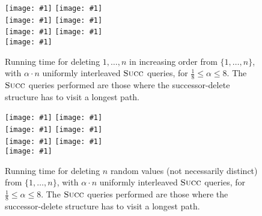 \documentclass[a4paper]{lipics-v2021}
\newcommand{\plot}[1]{\texttt{[image: \#1]}}
\newcommand{\FuncName}[1]{\textup{\textsc{#1}}}
\newcommand{\Succ}{\FuncName{Succ}}
\begin{document}
\begin{figure}[p]
  \plot{successor-query-worst-case-0.125.pdf} \hfill
  \plot{successor-query-worst-case-0.250.pdf} \\
  \plot{successor-query-worst-case-0.500.pdf} \hfill
  \plot{successor-query-worst-case-1.000.pdf} \\
  \plot{successor-query-worst-case-2.000.pdf} \hfill
  \plot{successor-query-worst-case-4.000.pdf} \\
  \plot{successor-query-worst-case-8.000.pdf} \hfill
  \hfill\begin{minipage}[b]{0.48\textwidth}
    \caption{Running time for deleting $1,\ldots,n$ in increasing order from $\{1,\ldots,n\}$, with $\alpha\cdot n$ uniformly interleaved $\Succ$ queries, for $\frac{1}{8} \leq \alpha \leq 8$. The $\Succ$ queries performed are those where the successor-delete structure has to visit a longest path.}
    \label{fig:plot-all-worst-case}
  \end{minipage}
\end{figure}

\begin{figure}[p]
  \plot{random-deletion-worst-case-query-0.125.pdf} \hfill
  \plot{random-deletion-worst-case-query-0.250.pdf} \\
  \plot{random-deletion-worst-case-query-0.500.pdf} \hfill
  \plot{random-deletion-worst-case-query-1.000.pdf} \\
  \plot{random-deletion-worst-case-query-2.000.pdf} \hfill
  \plot{random-deletion-worst-case-query-4.000.pdf} \\
  \plot{random-deletion-worst-case-query-8.000.pdf} \hfill
  \begin{minipage}[b]{0.48\textwidth}
    \caption{Running time for deleting $n$ random values (not necessarily distinct) from $\{1,\ldots,n\}$, with $\alpha\cdot n$ uniformly interleaved $\Succ$ queries, for $\frac{1}{8} \leq \alpha \leq 8$. The $\Succ$ queries performed are those where the successor-delete structure has to visit a longest path.}
    \label{fig:plot-all-random}
  \end{minipage}
\end{figure}

\end{document}
